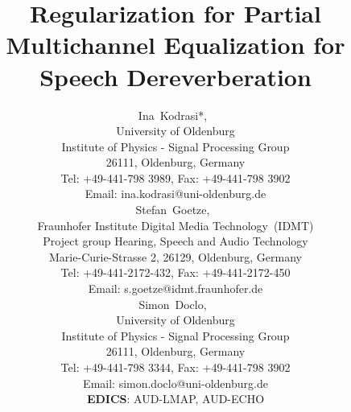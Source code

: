\documentclass[draftcls,onecolumn,11pt]{IEEEtran}
\begin{document}
%
\title{Regularization for Partial Multichannel Equalization for Speech Dereverberation}
\author{Ina~Kodrasi*,~ \\
University of Oldenburg \\[-0.2cm]
Institute of Physics - Signal Processing Group \\[-0.2cm]
26111, Oldenburg, Germany\\[-0.2cm]
Tel: +49-441-798 3989, Fax: +49-441-798 3902 \\[-0.2cm]
Email: ina.kodrasi@uni-oldenburg.de\\[+0.5cm]
Stefan~Goetze,~\\
Fraunhofer Institute Digital Media Technology~(IDMT) \\[-0.2cm]
Project group Hearing, Speech and Audio Technology \\[-0.2cm]
Marie-Curie-Strasse 2, 26129, Oldenburg, Germany \\[-0.2cm]
Tel: +49-441-2172-432, Fax: +49-441-2172-450\\[-0.2cm]
Email: s.goetze@idmt.fraunhofer.de \\[+0.5cm]
Simon~Doclo,~ \\
University of Oldenburg \\[-0.2cm]
Institute of Physics - Signal Processing Group \\[-0.2cm]
26111, Oldenburg, Germany\\[-0.2cm]
Tel: +49-441-798 3344, Fax: +49-441-798 3902 \\[-0.2cm]
Email: simon.doclo@uni-oldenburg.de\\[+0.5cm]
{\bf EDICS}: AUD-LMAP, AUD-ECHO}


\maketitle
\newpage
\end{document}

